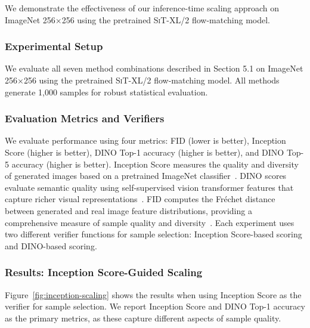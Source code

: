 \documentclass{article}
\begin{document}
We demonstrate the effectiveness of our inference-time scaling approach on ImageNet 256×256 using the pretrained \textsc{SiT-XL/2} flow-matching model.

\subsubsection{Experimental Setup}

We evaluate all seven method combinations described in Section 5.1 on ImageNet 256×256 using the pretrained \textsc{SiT-XL/2} flow-matching model. All methods generate 1,000 samples for robust statistical evaluation.

\subsubsection{Evaluation Metrics and Verifiers}

We evaluate performance using four metrics: FID (lower is better), Inception Score (higher is better), DINO Top-1 accuracy (higher is better), and DINO Top-5 accuracy (higher is better). Inception Score measures the quality and diversity of generated images based on a pretrained ImageNet classifier~\cite{salimans2016improved}. DINO scores evaluate semantic quality using self-supervised vision transformer features that capture richer visual representations~\cite{caron2021emerging}. FID computes the Fréchet distance between generated and real image feature distributions, providing a comprehensive measure of sample quality and diversity~\cite{heusel2017gans}. Each experiment uses two different verifier functions for sample selection: Inception Score-based scoring and DINO-based scoring.

\subsubsection{Results: Inception Score-Guided Scaling}

Figure~\ref{fig:inception-scaling} shows the results when using Inception Score as the verifier for sample selection. We report Inception Score and DINO Top-1 accuracy as the primary metrics, as these capture different aspects of sample quality.
\end{document}

